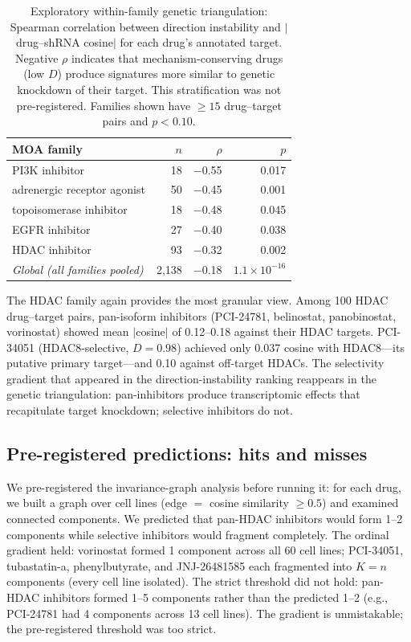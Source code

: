 \documentclass{article}
\begin{document}
\begin{table}[t]
\centering
\caption{Exploratory within-family genetic triangulation: Spearman
correlation between direction instability and $|$drug--shRNA cosine$|$ for
each drug's annotated target. Negative $\rho$ indicates that
mechanism-conserving drugs (low $D$) produce signatures more similar to
genetic knockdown of their target. This stratification was not pre-registered.
Families shown have $\geq 15$ drug--target pairs and $p < 0.10$.}
\label{tab:triangulation}
\small
\begin{tabular}{lrrr}
\toprule
MOA family & $n$ & $\rho$ & $p$ \\
\midrule
PI3K inhibitor & 18 & $-$0.55 & 0.017 \\
adrenergic receptor agonist & 50 & $-$0.45 & 0.001 \\
topoisomerase inhibitor & 18 & $-$0.48 & 0.045 \\
EGFR inhibitor & 27 & $-$0.40 & 0.038 \\
HDAC inhibitor & 93 & $-$0.32 & 0.002 \\
\midrule
\emph{Global (all families pooled)} & 2{,}138 & $-$0.18 & $1.1 \times 10^{-16}$ \\
\bottomrule
\end{tabular}
\end{table}

The HDAC family again provides the most granular view. Among 100 HDAC
drug--target pairs, pan-isoform inhibitors (PCI-24781, belinostat,
panobinostat, vorinostat) showed mean $|$cosine$|$ of 0.12--0.18 against
their HDAC targets. PCI-34051 (HDAC8-selective, $D = 0.98$) achieved only
0.037 cosine with HDAC8---its putative primary target---and 0.10 against
off-target HDACs. The selectivity gradient that appeared in the
direction-instability ranking reappears in the genetic triangulation:
pan-inhibitors produce transcriptomic effects that recapitulate target
knockdown; selective inhibitors do not.

\subsection{Pre-registered predictions: hits and misses}

We pre-registered the invariance-graph analysis before running it: for
each drug, we built a graph over cell lines (edge $=$ cosine similarity
$\geq 0.5$) and examined connected components. We predicted that
pan-HDAC inhibitors would form 1--2 components while selective
inhibitors would fragment completely. The ordinal gradient held:
vorinostat formed 1 component across all 60 cell lines; PCI-34051,
tubastatin-a, phenylbutyrate, and JNJ-26481585 each fragmented into
$K = n$ components (every cell line isolated). The strict threshold
did not hold: pan-HDAC inhibitors formed 1--5 components rather
than the predicted 1--2 (e.g., PCI-24781 had 4 components across
13 cell lines). The gradient is unmistakable; the pre-registered
threshold was too strict.
\end{document}

